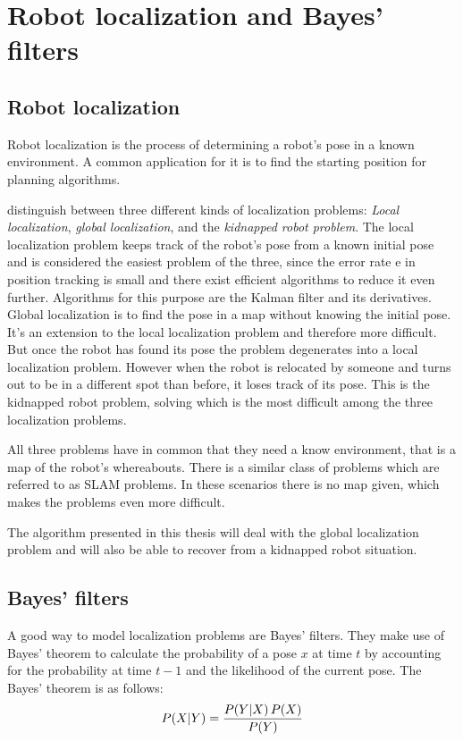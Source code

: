 \documentclass[Thesis.tex]{subfiles}
\begin{document}
\chapter{Robot localization and Bayes' filters}

\section{Robot localization}

Robot localization is the process of determining a robot's pose in a known environment. A common application for it is to find the starting position for planning algorithms. 

\citet{ThrunBurgardFox:2005} distinguish between three different kinds of localization problems: \emph{Local localization}, \emph{global localization}, and the \emph{kidnapped robot problem}. The local localization problem keeps track of the robot's pose from a known initial pose and is considered the easiest problem of the three, since the error rate e in position tracking is small and there exist efficient algorithms to reduce it even further. Algorithms for this purpose are the Kalman filter and its derivatives\cite[p.~40ff]{ThrunBurgardFox:2005}. Global localization is to find the pose in a map without knowing the initial pose. It's an extension to the local localization problem and therefore more difficult. But once the robot has found its pose the problem degenerates into a local localization problem. However when the robot is relocated by someone and turns out to be in a different spot than before, it loses track of its pose. This is the kidnapped robot problem, solving which is the most difficult among the three localization problems.

All three problems have in common that they need a know environment, that is a map of the robot's whereabouts. There is a similar class of problems which are referred to as \gls{SLAM} problems. In these scenarios there is no map given, which makes the problems even more difficult. 

The algorithm presented in this thesis will deal with the global localization problem and will also be able to recover from a kidnapped robot situation.

\section{Bayes' filters}
A good way to model localization problems are Bayes' filters. They make use of Bayes' theorem to calculate the probability of a pose $x$ at time $t$ by accounting for the probability at time $t-1$ and the likelihood of the current pose. The Bayes' theorem is as follows:
%
\begin{align}
\p[P]{X}{Y} = \frac{ \p[P]{Y}{X} P(X) } { P(Y) }
\end{align}
\end{document}
